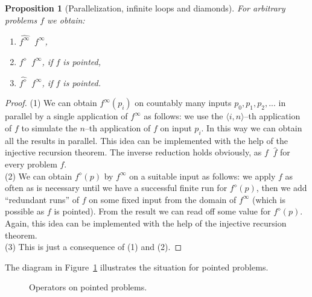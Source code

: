 \documentclass[11pt,a4paper]{amsart}
\theoremstyle{plain}
\newtheorem{prop}[thm]{Proposition}
\theoremstyle{definition}
\theoremstyle{defC}
\theoremstyle{thmC}
\theoremstyle{plain}
\numberwithin{equation}{section}
\def\leqSW{\mathop{\leq_{\mathrm{sW}}}}
\def\equivSW{\mathop{\equiv_{\mathrm{sW}}}}
\def\leqSW{\mathop{\leq_{\mathrm{sW}}}}
\def\equivSW{\mathop{\equiv_{\mathrm{sW}}}}
\def\id{{\mathrm{id}}}
\begin{document}
\begin{prop}[Parallelization, infinite loops and diamonds]
\label{prop:parallelization-diamond}
For arbitrary problems $f$ we obtain:
\begin{enumerate}
\item $\widehat{f^\infty}\equivSW f^\infty$,
\item $f^\diamond\leqSW f^\infty$, if $f$ is pointed,
\item $\widehat{f^\diamond}\leqSW f^\infty$, if $f$ is pointed.
\end{enumerate}
\end{prop}
\begin{proof}
(1) We can obtain $f^\infty(p_i)$ on countably many inputs $p_0,p_1,p_2,...$ in parallel
by a single application of $f^\infty$ as follows: we use the $\langle i,n\rangle$--th application
of $f$ to simulate the $n$--th application of $f$ on input $p_i$. In this way we can
obtain all the results in parallel. This idea can be implemented with the help
of the injective recursion theorem.
The inverse reduction holds obviously, as $f\leqSW\widehat{f}$ for every problem $f$.\\
(2) We can obtain $f^\diamond(p)$ by $f^\infty$ on a suitable input as follows:
we apply $f$ as often as is necessary until we have a successful finite run
for $f^\diamond(p)$, then we add ``redundant runs'' of $f$ on some fixed input
from the domain of $f^\infty$ (which is possible as $f$ is pointed).
From the result we can read off some value for $f^\diamond(p)$. 
Again, this idea can be implemented with the help of the injective recursion theorem.\\
(3) This is just a consequence of (1) and (2).
\end{proof}

\noindent
The diagram in Figure~\ref{fig:operators} illustrates the situation for pointed problems.

\begin{figure}[htb]
\begin{center}
\caption{Operators on pointed problems.}
\label{fig:operators}
\end{center}
\end{figure}
\end{document}
